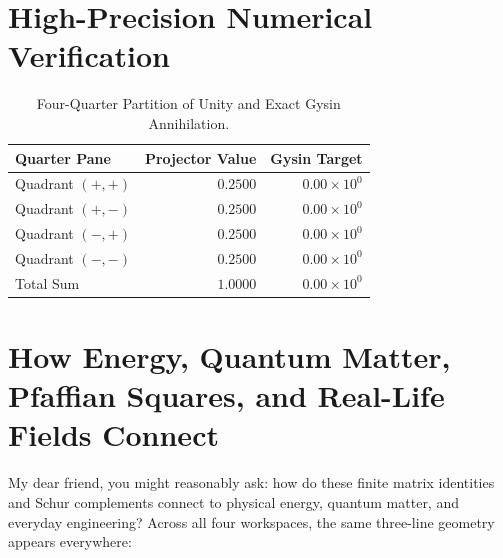 \documentclass[11pt,a4paper]{article}
\theoremstyle{definition}
\begin{document}
\section{High-Precision Numerical Verification}

\begin{table}[htbp]
\centering
\small
\begin{tabular}{lrr}
\toprule
\textbf{Quarter Pane} & \textbf{Projector Value} & \textbf{Gysin Target} \\
\midrule
Quadrant $(+, +)$ & $0.2500$ & $0.00 \times 10^0$ \\
Quadrant $(+, -)$ & $0.2500$ & $0.00 \times 10^0$ \\
Quadrant $(-, +)$ & $0.2500$ & $0.00 \times 10^0$ \\
Quadrant $(-, -)$ & $0.2500$ & $0.00 \times 10^0$ \\
Total Sum & $1.0000$ & $0.00 \times 10^0$ \\
\bottomrule
\end{tabular}
\caption{Four-Quarter Partition of Unity and Exact Gysin Annihilation.}
\end{table}


\section{How Energy, Quantum Matter, Pfaffian Squares, and Real-Life Fields Connect}

My dear friend, you might reasonably ask: how do these finite matrix identities and Schur complements connect to physical energy, quantum matter, and everyday engineering? Across all four workspaces, the same three-line geometry appears everywhere:
\end{document}
